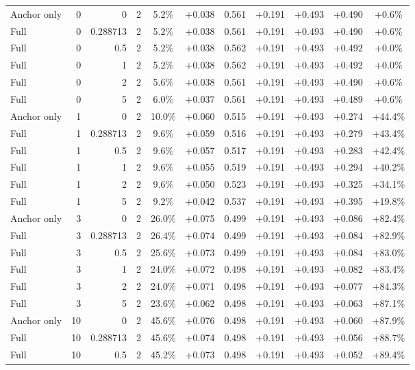 \begin{table}[htbp]
\begin{tabular}{lrrrccccccc}
Anchor only & 0 & 0 & 2 & 5.2\% & +0.038 & 0.561 & +0.191 & +0.493 & +0.490 & +0.6\% \\
Full & 0 & 0.288713 & 2 & 5.2\% & +0.038 & 0.561 & +0.191 & +0.493 & +0.490 & +0.6\% \\
Full & 0 & 0.5 & 2 & 5.2\% & +0.038 & 0.562 & +0.191 & +0.493 & +0.492 & +0.0\% \\
Full & 0 & 1 & 2 & 5.2\% & +0.038 & 0.562 & +0.191 & +0.493 & +0.492 & +0.0\% \\
Full & 0 & 2 & 2 & 5.6\% & +0.038 & 0.561 & +0.191 & +0.493 & +0.490 & +0.6\% \\
Full & 0 & 5 & 2 & 6.0\% & +0.037 & 0.561 & +0.191 & +0.493 & +0.489 & +0.6\% \\
Anchor only & 1 & 0 & 2 & 10.0\% & +0.060 & 0.515 & +0.191 & +0.493 & +0.274 & +44.4\% \\
Full & 1 & 0.288713 & 2 & 9.6\% & +0.059 & 0.516 & +0.191 & +0.493 & +0.279 & +43.4\% \\
Full & 1 & 0.5 & 2 & 9.6\% & +0.057 & 0.517 & +0.191 & +0.493 & +0.283 & +42.4\% \\
Full & 1 & 1 & 2 & 9.6\% & +0.055 & 0.519 & +0.191 & +0.493 & +0.294 & +40.2\% \\
Full & 1 & 2 & 2 & 9.6\% & +0.050 & 0.523 & +0.191 & +0.493 & +0.325 & +34.1\% \\
Full & 1 & 5 & 2 & 9.2\% & +0.042 & 0.537 & +0.191 & +0.493 & +0.395 & +19.8\% \\
Anchor only & 3 & 0 & 2 & 26.0\% & +0.075 & 0.499 & +0.191 & +0.493 & +0.086 & +82.4\% \\
Full & 3 & 0.288713 & 2 & 26.4\% & +0.074 & 0.499 & +0.191 & +0.493 & +0.084 & +82.9\% \\
Full & 3 & 0.5 & 2 & 25.6\% & +0.073 & 0.499 & +0.191 & +0.493 & +0.084 & +83.0\% \\
Full & 3 & 1 & 2 & 24.0\% & +0.072 & 0.498 & +0.191 & +0.493 & +0.082 & +83.4\% \\
Full & 3 & 2 & 2 & 24.0\% & +0.071 & 0.498 & +0.191 & +0.493 & +0.077 & +84.3\% \\
Full & 3 & 5 & 2 & 23.6\% & +0.062 & 0.498 & +0.191 & +0.493 & +0.063 & +87.1\% \\
Anchor only & 10 & 0 & 2 & 45.6\% & +0.076 & 0.498 & +0.191 & +0.493 & +0.060 & +87.9\% \\
Full & 10 & 0.288713 & 2 & 45.6\% & +0.074 & 0.498 & +0.191 & +0.493 & +0.056 & +88.7\% \\
Full & 10 & 0.5 & 2 & 45.2\% & +0.073 & 0.498 & +0.191 & +0.493 & +0.052 & +89.4\% \\

\end{tabular}
\end{table}
